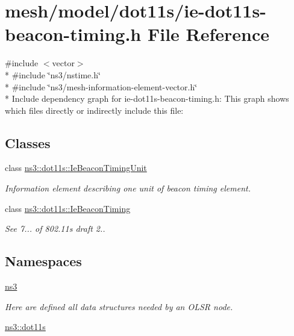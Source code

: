 \hypertarget{ie-dot11s-beacon-timing_8h}{}\section{mesh/model/dot11s/ie-\/dot11s-\/beacon-\/timing.h File Reference}
\label{ie-dot11s-beacon-timing_8h}
{\ttfamily \#include $<$vector$>$}\\*
{\ttfamily \#include \char`\"{}ns3/nstime.\+h\char`\"{}}\\*
{\ttfamily \#include \char`\"{}ns3/mesh-\/information-\/element-\/vector.\+h\char`\"{}}\\*
Include dependency graph for ie-\/dot11s-\/beacon-\/timing.h\+:
This graph shows which files directly or indirectly include this file\+:
\subsection*{Classes}
\begin{DoxyCompactItemize}
\item 
class \hyperlink{classns3_1_1dot11s_1_1IeBeaconTimingUnit}{ns3\+::dot11s\+::\+Ie\+Beacon\+Timing\+Unit}
\begin{DoxyCompactList}\small\item\em Information element describing one unit of beacon timing element. \end{DoxyCompactList}\item 
class \hyperlink{classns3_1_1dot11s_1_1IeBeaconTiming}{ns3\+::dot11s\+::\+Ie\+Beacon\+Timing}
\begin{DoxyCompactList}\small\item\em See 7... of 802.\+11s draft 2.. \end{DoxyCompactList}\end{DoxyCompactItemize}
\subsection*{Namespaces}
\begin{DoxyCompactItemize}
\item 
 \hyperlink{namespacens3}{ns3}
\begin{DoxyCompactList}\small\item\em Here are defined all data structures needed by an O\+L\+SR node. \end{DoxyCompactList}\item 
 \hyperlink{namespacens3_1_1dot11s}{ns3\+::dot11s}
\end{DoxyCompactItemize}

